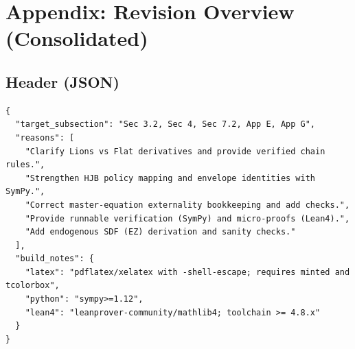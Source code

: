\documentclass[11pt,letterpaper,oneside]{article}
\numberwithin{equation}{section}
\newcommand{\1}{\mathbf{1}}
\begin{document}
\section*{Appendix: Revision Overview (Consolidated)}

\subsection*{Header (JSON)}
\begin{tcolorbox}[sympycheckstyle,title={Editorial Header (JSON)}]
\begin{Verbatim}[fontsize=\small]
{
  "target_subsection": "Sec 3.2, Sec 4, Sec 7.2, App E, App G",
  "reasons": [
    "Clarify Lions vs Flat derivatives and provide verified chain rules.",
    "Strengthen HJB policy mapping and envelope identities with SymPy.",
    "Correct master-equation externality bookkeeping and add checks.",
    "Provide runnable verification (SymPy) and micro-proofs (Lean4).",
    "Add endogenous SDF (EZ) derivation and sanity checks."
  ],
  "build_notes": {
    "latex": "pdflatex/xelatex with -shell-escape; requires minted and tcolorbox",
    "python": "sympy>=1.12",
    "lean4": "leanprover-community/mathlib4; toolchain >= 4.8.x"
  }
}
\end{Verbatim}
\end{tcolorbox}
\end{document}

